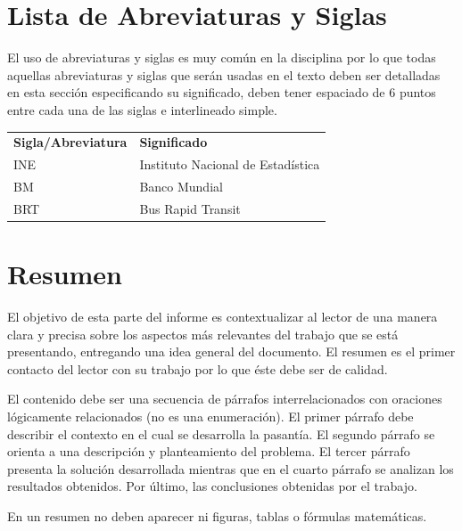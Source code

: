 \documentclass[12pt,letterpaper]{report}
\begin{document}
\newpage
\chapter*{Lista de Abreviaturas y Siglas}

El uso de abreviaturas y siglas es muy común en la disciplina por lo que todas aquellas abreviaturas y siglas que serán usadas en el texto deben ser detalladas en esta sección especificando su significado, deben tener espaciado de 6 puntos entre cada una de las siglas e interlineado simple.

\vspace{6pt}
\begin{tabular}{ll}
\textbf{Sigla/Abreviatura} & \textbf{Significado} \\[6pt]
INE & Instituto Nacional de Estadística \\[6pt]
BM & Banco Mundial \\[6pt]
BRT & Bus Rapid Transit \\
\end{tabular}

\newpage
\chapter*{Resumen}

El objetivo de esta parte del informe es contextualizar al lector de una manera clara y precisa sobre los aspectos más relevantes del trabajo que se está presentando, entregando una idea general del documento. El resumen es el primer contacto del lector con su trabajo por lo que éste debe ser de calidad.

El contenido debe ser una secuencia de párrafos interrelacionados con oraciones lógicamente relacionados (no es una enumeración). El primer párrafo debe describir el contexto en el cual se desarrolla la pasantía. El segundo párrafo se orienta a una descripción y planteamiento del problema. El tercer párrafo presenta la solución desarrollada mientras que en el cuarto párrafo se analizan los resultados obtenidos. Por último, las conclusiones obtenidas por el trabajo.

En un resumen no deben aparecer ni figuras, tablas o fórmulas matemáticas.
\end{document}
